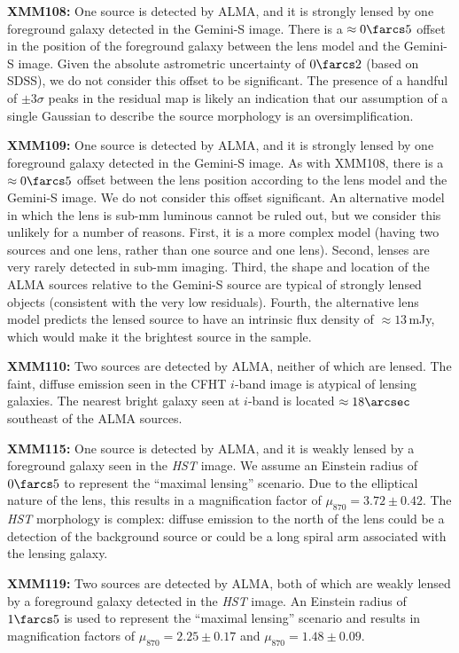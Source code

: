 \documentclass[iop]{emulateapj}
\begin{document}
{\bf XMM108:} One source is detected by ALMA, and it is strongly lensed by one
foreground galaxy detected in the Gemini-S image.  There is a $\approx
0\farcs5$ offset in the position of the foreground galaxy between the lens
model and the Gemini-S image.  Given the absolute astrometric uncertainty of
$0\farcs2$ (based on SDSS), we do not consider this offset to be significant.
The presence of a handful of $\pm3\sigma$ peaks in the residual map is likely
an indication that our assumption of a single Gaussian to describe the source
morphology is an oversimplification.

{\bf XMM109:} One source is detected by ALMA, and it is strongly lensed by one
foreground galaxy detected in the Gemini-S image.  As with XMM108, there is a
$\approx 0\farcs5$ offset between the lens position according to the lens model
and the Gemini-S image.  We do not consider this offset significant.  An
alternative model in which the lens is sub-mm luminous cannot be ruled out, but
we consider this unlikely for a number of reasons.  First, it is a more complex
model (having two sources and one lens, rather than one source and one lens).
Second, lenses are very rarely detected in sub-mm imaging.  Third, the shape
and location of the ALMA sources relative to the Gemini-S source are typical of
strongly lensed objects (consistent with the very low residuals).  Fourth, the
alternative lens model predicts the lensed source to have an intrinsic flux
density of $\approx 13 \,$mJy, which would make it the brightest source in the
sample.

{\bf XMM110:} Two sources are detected by ALMA, neither of which are lensed.
The faint, diffuse emission seen in the CFHT $i$-band image is atypical of
lensing galaxies.  The nearest bright galaxy seen at $i$-band is located
$\approx 18\arcsec$ southeast of the ALMA sources.

{\bf XMM115:} One source is detected by ALMA, and it is weakly lensed by a
foreground galaxy seen in the {\it HST} image.  We assume an Einstein radius of
$0\farcs5$ to represent the ``maximal lensing'' scenario.  Due to the
elliptical nature of the lens, this results in a magnification factor of
$\mu_{870} = 3.72 \pm 0.42$.  The {\it HST} morphology is complex: diffuse
emission to the north of the lens could be a detection of the background source
or could be a long spiral arm associated with the lensing galaxy.

{\bf XMM119:} Two sources are detected by ALMA, both of which are weakly
lensed by a foreground galaxy detected in the {\it HST} image.  An Einstein
radius of $1\farcs5$ is used to represent the ``maximal lensing'' scenario and
results in magnification factors of $\mu_{870} = 2.25 \pm 0.17$ and $\mu_{870}
= 1.48 \pm 0.09$.
\end{document}

